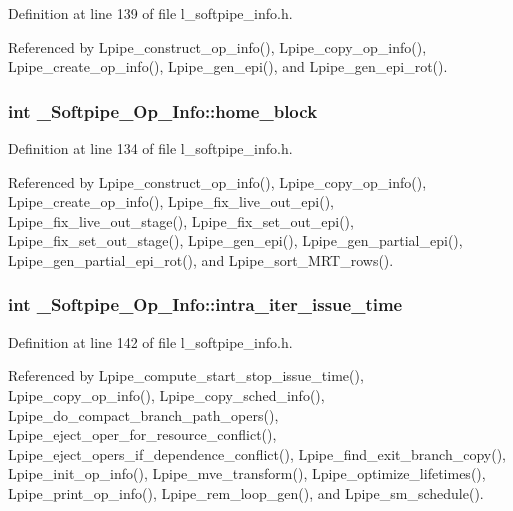 Definition at line 139 of file l\_\-softpipe\_\-info.h.

Referenced by Lpipe\_\-construct\_\-op\_\-info(), Lpipe\_\-copy\_\-op\_\-info(), Lpipe\_\-create\_\-op\_\-info(), Lpipe\_\-gen\_\-epi(), and Lpipe\_\-gen\_\-epi\_\-rot().
\subsubsection{\setlength{\rightskip}{0pt plus 5cm}int \bf{\_\-Softpipe\_\-Op\_\-Info::home\_\-block}}\label{struct__Softpipe__Op__Info_15915ccd432c55617a5283f8cca8c558}




Definition at line 134 of file l\_\-softpipe\_\-info.h.

Referenced by Lpipe\_\-construct\_\-op\_\-info(), Lpipe\_\-copy\_\-op\_\-info(), Lpipe\_\-create\_\-op\_\-info(), Lpipe\_\-fix\_\-live\_\-out\_\-epi(), Lpipe\_\-fix\_\-live\_\-out\_\-stage(), Lpipe\_\-fix\_\-set\_\-out\_\-epi(), Lpipe\_\-fix\_\-set\_\-out\_\-stage(), Lpipe\_\-gen\_\-epi(), Lpipe\_\-gen\_\-partial\_\-epi(), Lpipe\_\-gen\_\-partial\_\-epi\_\-rot(), and Lpipe\_\-sort\_\-MRT\_\-rows().
\subsubsection{\setlength{\rightskip}{0pt plus 5cm}int \bf{\_\-Softpipe\_\-Op\_\-Info::intra\_\-iter\_\-issue\_\-time}}\label{struct__Softpipe__Op__Info_7d7e64bcab97f4fccde857ee7430b6ec}




Definition at line 142 of file l\_\-softpipe\_\-info.h.

Referenced by Lpipe\_\-compute\_\-start\_\-stop\_\-issue\_\-time(), Lpipe\_\-copy\_\-op\_\-info(), Lpipe\_\-copy\_\-sched\_\-info(), Lpipe\_\-do\_\-compact\_\-branch\_\-path\_\-opers(), Lpipe\_\-eject\_\-oper\_\-for\_\-resource\_\-conflict(), Lpipe\_\-eject\_\-opers\_\-if\_\-dependence\_\-conflict(), Lpipe\_\-find\_\-exit\_\-branch\_\-copy(), Lpipe\_\-init\_\-op\_\-info(), Lpipe\_\-mve\_\-transform(), Lpipe\_\-optimize\_\-lifetimes(), Lpipe\_\-print\_\-op\_\-info(), Lpipe\_\-rem\_\-loop\_\-gen(), and Lpipe\_\-sm\_\-schedule().
